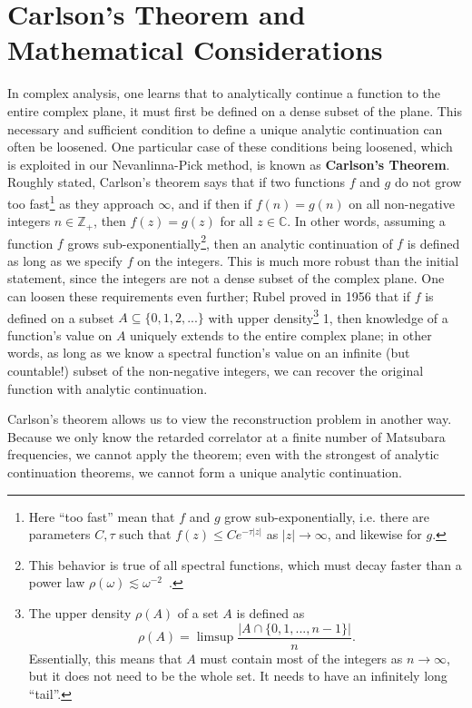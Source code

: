 \section{Carlson's Theorem and Mathematical Considerations}
\label{sec:carleson}

In complex analysis, one learns that to analytically continue a function to the entire complex plane, it must first be defined on a dense subset of the plane.
This necessary and sufficient condition to define a unique analytic continuation can often be loosened.
One particular case of these conditions being loosened, which is exploited in our Nevanlinna-Pick method, is known as \textbf{Carlson's Theorem}. 
Roughly stated, Carlson's theorem says that if two functions $f$ and $g$ do not grow too fast\footnote{Here ``too fast'' mean that $f$ and $g$ grow sub-exponentially, i.e. there are parameters $C, \tau$ such that $f(z)\leq Ce^{-\tau|z|}$ as $|z|\rightarrow\infty$, and likewise for $g$.} as they approach $\infty$, and if then if $f(n) = g(n)$ on all non-negative integers $n\in\mathbb Z_+$, then $f(z) = g(z)$ for all $z\in\mathbb C$. 
In other words, assuming a function $f$ grows sub-exponentially\footnote{This behavior is true of all spectral functions, which must decay faster than a power law $\rho(\omega)\lesssim \omega^{-2}$~\cite{TODO}.}, then an analytic continuation of $f$ is defined as long as we specify $f$ on the integers. 
This is much more robust than the initial statement, since the integers are not a dense subset of the complex plane. 
One can loosen these requirements even further; Rubel proved in 1956 that if $f$ is defined on a subset $A\subseteq \{0, 1, 2, ...\}$  with upper density\footnote{The upper density $\rho(A)$ of a set $A$ is defined as \begin{equation}\rho(A) = \limsup \frac{|A\cap \{0, 1, ..., n - 1\}|}{n} .\end{equation}Essentially, this means that $A$ must contain most of the integers as $n\rightarrow\infty$, but it does not need to be the whole set. It needs to have an infinitely long ``tail''. } 1, then knowledge of a function's value on $A$ uniquely extends to the entire complex plane; in other words, as long as we know a spectral function's value on an infinite (but countable!) subset of the non-negative integers, we can recover the original function with analytic continuation. 

Carlson's theorem allows us to view the reconstruction problem in another way. Because we only know the retarded correlator at a finite number of Matsubara frequencies, we cannot apply the theorem; even with the strongest of analytic continuation theorems, we cannot form a unique analytic continuation. 

